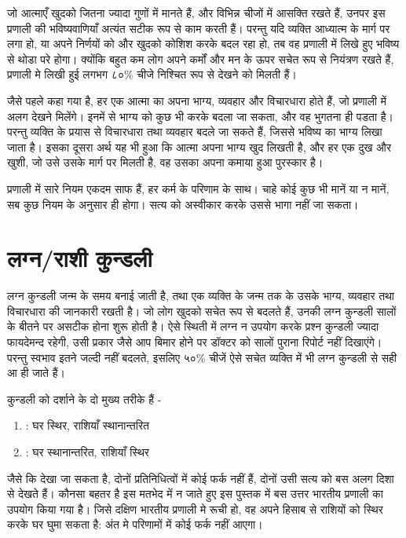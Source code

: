 जो आत्माएँ  खुदको जितना ज्यादा गुणों में मानते हैं, और विभिन्न चीजों में आसक्ति रखते हैं, उनपर इस प्रणाली की भविष्यवाणियाँ अत्यंत सटीक रूप से काम करती हैं। परन्तु यदि व्यक्ति आध्यात्म के मार्ग पर लगा हो, या अपने निर्णयों को और खुदको कोशिश करके बदल रहा हो, तब  वह प्रणाली में लिखे हुए भविष्य से थोडा परे होगा। क्योंकि बहुत कम लोग  अपने कर्मों और मन के ऊपर सचेत रूप से नियंत्रण रखते हैं, प्रणाली मे लिखी हुई लगभग ८०\% चीजे निश्चित रूप से देखने को मिलती हैं।

जैसे पहले कहा गया है, हर एक आत्मा का अपना भाग्य, व्यवहार और विचारधारा होते हैं, जो प्रणाली में अलग देखने मिलेंगे। इनमें से भाग्य को कुछ भी करके बदला  जा सकता, और वह भुगतना ही पडता है। परन्तु व्यक्ति के प्रयास से विचारधारा तथा व्यवहार बदले जा सकते हैं, जिससे भविष्य का भाग्य लिखा जाता है। इसका दूसरा अर्थ यह भी हुआ कि आत्मा अपना भाग्य खुद लिखती है, और हर एक दुख और खुशी, जो उसे उसके मार्ग पर मिलती है, वह उसका अपना कमाया हुआ पुरस्कार है। 

प्रणाली में सारे नियम एकदम साफ हैं,  हर कर्म के परिणाम के साथ। चाहे कोई कुछ भी मानें या न मानें, सब कुछ नियम के अनुसार ही होगा। सत्य को अस्वीकार करके उससे भागा नहीं जा सकता।
\chapter[व्यक्ति]{लग्न/राशी कुन्डली} \label{chap:lagna}
लग्न कुन्डली जन्म के समय बनाई जाती है, तथा एक व्यक्ति के जन्म तक के उसके भाग्य, व्यवहार तथा विचारधारा की जानकारी रखती है। जो लोग खुदको सचेत रूप से बदलते हैं, उनकी लग्न कुन्डली सालों के बीतने पर असटीक होना शुरू होती है। ऐसे स्थिती में लग्न न उपयोग करके प्रश्न कुन्डली ज्यादा फायदेमन्द रहेगी, उसी प्रकार जैसे आप बिमार होने पर डॉक्टर को सालों पुराना रिपोर्ट नहीं दिखाएंगे। परन्तु स्वभाव इतने जल्दी नहीं बदलते, इसलिए ५०\% चीजें ऐसे सचेत व्यक्ति में भी लग्न कुन्डली से सही आ ही जाते हैं।

कुन्डली को दर्शाने के दो मुख्य तरीके हैं -
\begin{enumerate}
    \item {} : घर स्थिर, राशियाँ स्थानान्तरित
    \item {} : घर स्थानान्तरित, राशियाँ स्थिर
\end{enumerate}
जैसे कि देखा जा सकता है, दोनों प्रतिनिधित्वों में कोई फर्क नहीं हैं, दोनों उसी सत्य को बस अलग दिशा से देखते हैं। कौनसा बहतर है इस मतभेद में न जाते हुए इस पुस्तक में बस उत्तर भारतीय प्रणाली का उपयोग किया गया है। जिसे दक्षिण भारतीय प्रणाली मे रूची हो, वह अपने हिसाब से राशियों को स्थिर करके घर घुमा सकता है: अंत मे परिणामों में कोई फर्क नहीं आएगा।

